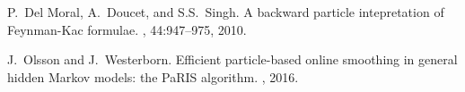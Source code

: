 \documentclass[12pt]{article}
\newcommand{\1}{\mathrm{1}}
\begin{document}

\begin{thebibliography}{10}

P.~{D}el {M}oral, {A}.~{D}oucet, and {S}.{S}.~{S}ingh.
\newblock A backward particle intepretation of {F}eynman-{K}ac formulae.
, 44:947--975, 2010.

J.~Olsson and J.~Westerborn.
\newblock Efficient particle-based online smoothing in general hidden {M}arkov
  models: the {PaRIS} algorithm.
, 2016.


\end{thebibliography}
\end{document}
